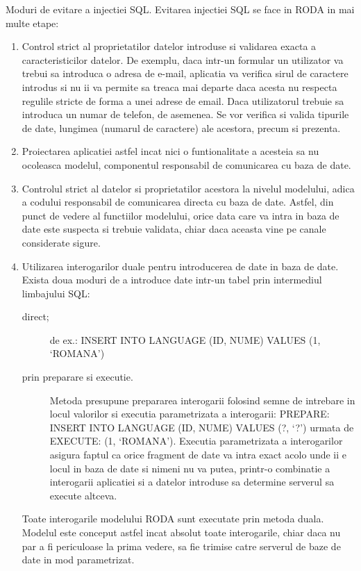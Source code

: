 Moduri de evitare a injectiei SQL. Evitarea injectiei SQL se face in RODA in mai multe etape:
\begin{enumerate}
  \item 
Control strict al proprietatilor datelor introduse si validarea exacta a caracteristicilor datelor. De exemplu,
daca intr-un formular un utilizator va trebui sa introduca o adresa de e-mail, aplicatia va verifica sirul de caractere
introdus si nu ii va permite sa treaca mai departe daca acesta nu respecta regulile stricte de forma a unei adrese de
email. Daca utilizatorul trebuie sa introduca un numar de telefon, de asemenea. Se vor verifica si valida tipurile de
date, lungimea (numarul de caractere) ale acestora, precum si prezenta.
\item
Proiectarea aplicatiei astfel incat nici o funtionalitate a acesteia
sa nu ocoleasca modelul, componentul responsabil de comunicarea cu baza de date.
\item
Controlul strict al datelor si proprietatilor acestora la nivelul
modelului, adica a codului responsabil de comunicarea directa cu baza de date. Astfel, din punct de vedere al functiilor modelului, orice data care va intra in
baza de date este suspecta si trebuie validata, chiar daca aceasta vine pe canale considerate sigure.
\item
Utilizarea interogarilor duale pentru introducerea de date in baza
de date. Exista doua moduri de a introduce date intr-un tabel prin intermediul limbajului SQL:
\begin{description}
	\item [direct;] de ex.: 
INSERT INTO LANGUAGE (ID, NUME) VALUES (1, `ROMANA')
	\item [prin preparare si executie.] Metoda presupune prepararea interogarii folosind
semne de intrebare in locul valorilor si executia parametrizata a interogarii: 
PREPARE: INSERT INTO LANGUAGE (ID, NUME) VALUES (?, `?') 
urmata de
EXECUTE: (1, `ROMANA'). 
Executia parametrizata a interogarilor asigura faptul ca orice fragment de date va intra exact
acolo unde ii e locul in baza de date si nimeni nu va putea, printr-o combinatie a interogarii aplicatiei si a datelor
introduse sa determine serverul sa execute altceva. 
\end{description}
Toate interogarile modelului RODA sunt executate prin metoda duala. Modelul este conceput astfel incat absolut toate
interogarile, chiar daca nu par a fi periculoase la prima vedere, sa fie trimise catre serverul de baze de date in mod
parametrizat.
\end{enumerate}


